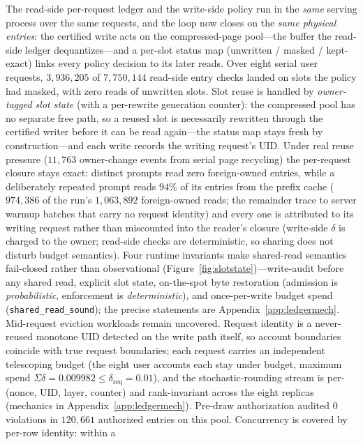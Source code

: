 \documentclass[11pt]{article}
\begin{document}
The read-side per-request ledger and the write-side policy run in the \emph{same}
serving process over the same requests, and the loop now closes on the
\emph{same physical entries}: the certified write acts on the compressed-page
pool---the buffer the read-side ledger dequantizes---and a per-slot status map
(unwritten / masked / kept-exact) links every policy decision to its later
reads. Over eight serial user requests, $3{,}936{,}205$ of $7{,}750{,}144$
read-side entry checks landed on slots the policy had masked, with zero reads
of unwritten slots. Slot reuse is handled by \emph{owner-tagged slot state}
(with a per-rewrite generation counter): the
compressed pool has no separate free path, so a reused slot is necessarily
rewritten through the certified writer before it can be read again---the
status map stays fresh by construction---and each write records the writing
request's UID. Under real reuse pressure ($11{,}763$ owner-change events from
serial page recycling) the per-request closure stays exact: distinct prompts
read zero foreign-owned entries, while a deliberately repeated prompt reads
$94\%$ of its entries from the prefix cache ($974{,}386$ of the run's
$1{,}063{,}892$ foreign-owned reads; the remainder trace to server warmup
batches that carry no request identity) and every one is attributed to
its writing request rather than miscounted into the reader's closure
(write-side $\delta$ is charged to the owner; read-side checks are
deterministic, so sharing does not disturb budget semantics). 
Four runtime
invariants make shared-read semantics fail-closed rather than
observational (Figure~\ref{fig:slotstate})---write-audit before any shared read, explicit slot state,
on-the-spot byte restoration (admission is \emph{probabilistic},
enforcement is \emph{deterministic}), and once-per-write budget spend
(\texttt{shared\_read\_sound}); the precise statements are
Appendix~\ref{app:ledgermech}. Mid-request
eviction workloads remain uncovered. Request identity is a never-reused monotone UID detected on the
write path itself, so account boundaries coincide with true request
boundaries; each request carries an independent telescoping budget (the
eight user accounts each stay under budget, maximum spend
$\Sigma\delta = 0.009982 \le \delta_{\mathrm{req}} = 0.01$), and the
stochastic-rounding stream is per-(nonce, UID, layer, counter) and
rank-invariant across the eight replicas
(mechanics in Appendix~\ref{app:ledgermech}).
Pre-draw authorization audited $0$ violations in $120{,}661$ authorized
entries on this pool. Concurrency is covered by per-row identity: within a
\end{document}
